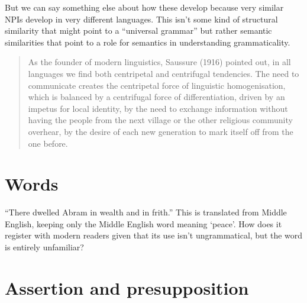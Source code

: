 But we can say something else about how these develop because very similar NPIs develop in very different languages. This isn't some kind of structural similarity that might point to a \enquote{universal grammar} but rather semantic similarities that point to a role for semantics in understanding grammaticality.

\begin{quote}
    As the founder of modern linguistics, Saussure (1916)
pointed out, in all languages we find both centripetal and
centrifugal tendencies. The need to communicate creates
the centripetal force of linguistic homogenisation, which is
balanced by a centrifugal force of differentiation, driven by
an impetus for local identity, by the need to exchange
information without having the people from the next village
or the other religious community overhear, by the desire of
each new generation to mark itself off from the one before. \cite{Joseph2015}
\end{quote}

\section{Words}

\enquote{There dwelled Abram in wealth and in frith.} This is translated from Middle English, keeping only the Middle English word  meaning `peace'. How does it register with modern readers given that its use isn't ungrammatical, but the word is entirely unfamiliar?

\section{Assertion and presupposition}

